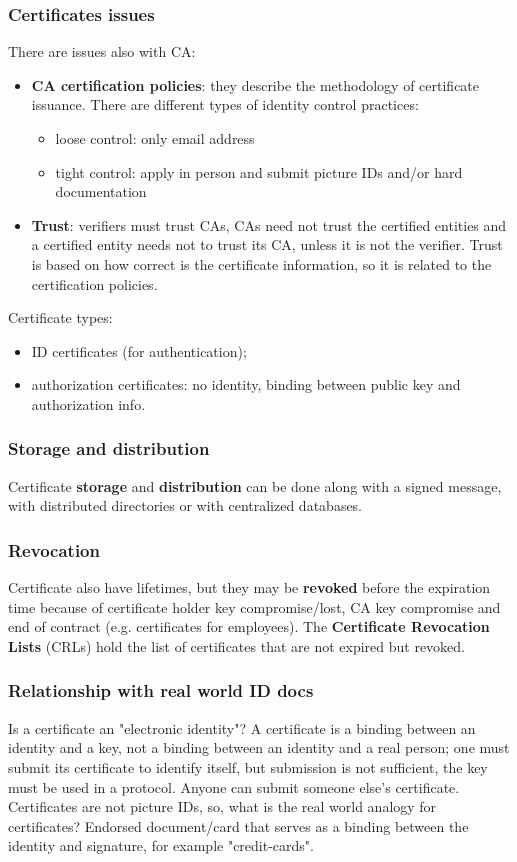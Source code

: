 \documentclass[a4paper, 10pt, titlepage]{article}
\begin{document}
\subsubsection*{Certificates issues}
There are issues also with CA:
\begin{itemize}
\item \textbf{CA certification policies}: they describe the methodology of certificate issuance. There are different types of identity control practices:
	\begin{itemize}
	\item loose control: only email address
	\item tight control: apply in person and submit picture IDs and/or hard documentation
	\end{itemize}
\item \textbf{Trust}: verifiers must trust CAs, CAs need not trust the certified entities and a certified entity needs not to trust its CA, unless it is not the verifier.
Trust is based on how correct is the certificate information, so it is related to the certification policies.
\end{itemize}
Certificate types:
\begin{itemize}
\item ID certificates (for authentication);
\item authorization certificates: no identity, binding between public key and authorization info.
\end{itemize}

\subsubsection*{Storage and distribution}
Certificate \textbf{storage} and \textbf{distribution} can be done along with a signed message, with distributed directories or with centralized databases.
\subsubsection*{Revocation}
Certificate also have lifetimes, but they may be \textbf{revoked} before the expiration time because of certificate holder key compromise/lost, CA key compromise and  end of contract (e.g. certificates for employees). The \textbf{Certificate Revocation Lists} (CRLs) hold the list of certificates that are not expired but revoked.

\subsubsection*{Relationship with real world ID docs}
Is a certificate an "electronic identity"? A certificate is a binding between an identity and a key, not a binding between an identity and a real person; one must submit its certificate to identify itself, but submission is not sufficient, the key must be used in a protocol. Anyone can submit someone else’s certificate. Certificates are not picture IDs, so, what is the real world analogy for certificates?
Endorsed document/card that serves as a binding between the identity and signature, for example "credit-cards".
\end{document}
